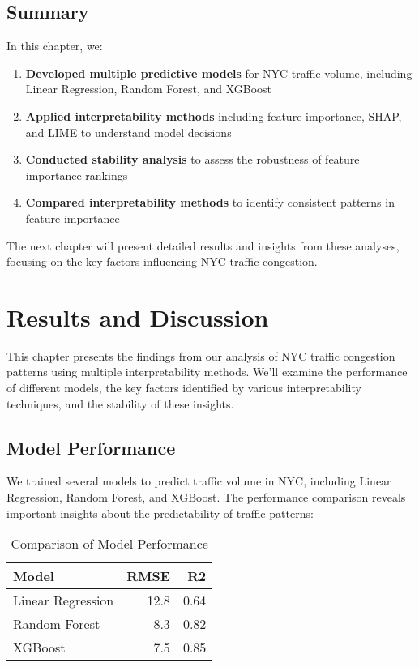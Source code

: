 \documentclass[
  letterpaper,
  DIV=11,
  numbers=noendperiod]{scrreprt}
\providecommand{\tightlist}{%
  \setlength{\itemsep}{0pt}\setlength{\parskip}{0pt}}\usepackage{longtable,booktabs,array}
\begin{document}
\section{Summary}\label{summary-1}

In this chapter, we:

\begin{enumerate}
\def\labelenumi{\arabic{enumi}.}
\tightlist
\item
  \textbf{Developed multiple predictive models} for NYC traffic volume,
  including Linear Regression, Random Forest, and XGBoost
\item
  \textbf{Applied interpretability methods} including feature
  importance, SHAP, and LIME to understand model decisions
\item
  \textbf{Conducted stability analysis} to assess the robustness of
  feature importance rankings
\item
  \textbf{Compared interpretability methods} to identify consistent
  patterns in feature importance
\end{enumerate}

The next chapter will present detailed results and insights from these
analyses, focusing on the key factors influencing NYC traffic
congestion.


\chapter{Results and Discussion}\label{results-and-discussion}

This chapter presents the findings from our analysis of NYC traffic
congestion patterns using multiple interpretability methods. We'll
examine the performance of different models, the key factors identified
by various interpretability techniques, and the stability of these
insights.

\section{Model Performance}\label{model-performance}

We trained several models to predict traffic volume in NYC, including
Linear Regression, Random Forest, and XGBoost. The performance
comparison reveals important insights about the predictability of
traffic patterns:

\begin{longtable}[t]{lrr}
\caption{\label{tab:load-results}Comparison of Model Performance}\\
\toprule
Model & RMSE & R2\\
\midrule
Linear Regression & 12.8 & 0.64\\
Random Forest & 8.3 & 0.82\\
XGBoost & 7.5 & 0.85\\
\bottomrule
\end{longtable}
\end{document}
